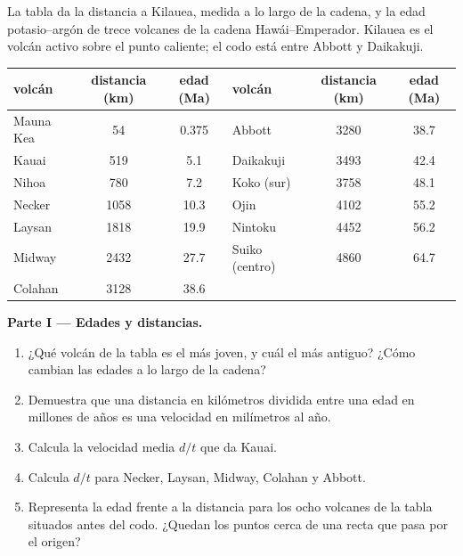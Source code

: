 \begin{problem}
\label{pb:g11:plate-motions:1}
La tabla da la distancia a Kilauea, medida a lo largo de la cadena, y la edad
potasio--argón de trece volcanes de la cadena Hawái--Emperador. Kilauea es el
volcán activo sobre el punto caliente; el codo está entre Abbott y
Daikakuji.

\begin{center}
\small
\begin{tabular}{|l|c|c||l|c|c|}
\hline
volcán & distancia (\unit{km}) & edad (\unit{Ma}) & volcán & distancia (\unit{km}) & edad (\unit{Ma}) \\ \hline
Mauna Kea & 54 & 0.375 & Abbott & 3280 & 38.7 \\ \hline
Kauai & 519 & 5.1 & Daikakuji & 3493 & 42.4 \\ \hline
Nihoa & 780 & 7.2 & Koko (sur) & 3758 & 48.1 \\ \hline
Necker & 1058 & 10.3 & Ojin & 4102 & 55.2 \\ \hline
Laysan & 1818 & 19.9 & Nintoku & 4452 & 56.2 \\ \hline
Midway & 2432 & 27.7 & Suiko (centro) & 4860 & 64.7 \\ \hline
Colahan & 3128 & 38.6 & & & \\ \hline
\end{tabular}
\end{center}

\medskip
\noindent\textbf{Parte I --- Edades y distancias.}
\begin{enumerate}
  \item ¿Qué volcán de la tabla es el más joven, y cuál el más antiguo? ¿Cómo
        cambian las edades a lo largo de la cadena?
  \item Demuestra que una distancia en kilómetros dividida entre una edad en
        millones de años es una velocidad en milímetros al año.
  \item Calcula la velocidad media $d/t$ que da Kauai.
  \item Calcula $d/t$ para Necker, Laysan, Midway, Colahan y Abbott.
  \item Representa la edad frente a la distancia para los ocho volcanes de la
        tabla situados antes del codo. ¿Quedan los puntos cerca de una recta que pasa por
        el origen?
\end{enumerate}


\end{problem}
